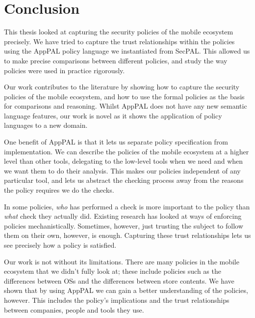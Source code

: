 \documentclass[thesis.tex]{subfiles}
\begin{document}
\chapter{Conclusion}

This thesis looked at capturing the security policies of the
mobile ecosystem precisely. We have tried to capture the trust
relationships within the policies using the AppPAL policy language we
instantiated from SecPAL. This allowed us to make precise comparisons
between different policies, and study the way policies were used in
practice rigorously.

Our work contributes to the literature by showing how to capture the
security policies of the mobile ecosystem, and how to use
the formal policies as the basis for comparisons and reasoning. Whilst
AppPAL does not have any new semantic language features, our work is
novel as it shows the application of policy languages to a new domain.

One benefit of AppPAL is that it lets us separate policy specification
from implementation. We can describe the policies of the mobile
ecosystem at a higher level than other tools, delegating to the
low-level tools when we need and when we want them to do their
analysis. This makes our policies independent of any particular tool,
and lets us abstract the checking process away from the reasons the
policy requires we do the checks.

In some policies, \emph{who} has performed a check is more important
to the policy than \emph{what} check they actually did. Existing
research has looked at ways of enforcing policies
mechanistically. Sometimes, however, just trusting the subject to
follow them on their own, however, is enough.  Capturing these trust
relationships lets us see precisely how a policy is satisfied.

Our work is not without its limitations. There are many policies in
the mobile ecosystem that we didn't fully look at; these include
policies such as the differences between OSs and the differences between
store contents. We have shown that by using AppPAL we can gain a
better understanding of the policies, however. This includes the
policy's implications and the trust relationships between companies,
people and tools they use.

\hspace{1em}
\end{document}
